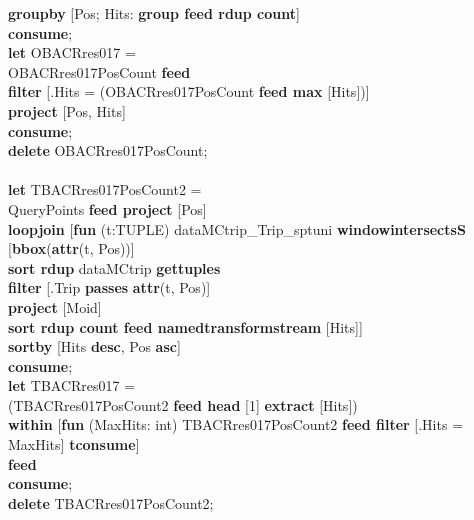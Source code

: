 \documentclass[a4paper]{article}
\newcommand{\op}[1]{\textbf{#1}}
\begin{document}
\begin{scriptsize}
\begin{tabbing}
\>\op{groupby} [Pos; Hits: \op{group feed rdup count}]\\
\op{consume};\\
\op{let} OBACRres017 =\\
\>OBACRres017PosCount \op{feed}\\
\>\op{filter} [.Hits = (OBACRres017PosCount \op{feed max} [Hits])]\\
\>\op{project} [Pos, Hits]\\
\op{consume};\\
\op{delete} OBACRres017PosCount;\\
\\
\op{let} TBACRres017PosCount2 =\\
\>QueryPoints \op{feed project} [Pos]\\
\>\op{loopjoin} [\op{fun} (t:TUPLE) dataMCtrip\_Trip\_sptuni \op{windowintersectsS} [\op{bbox}(\op{attr}(t, Pos))]\\
\>\>\op{sort rdup} dataMCtrip \op{gettuples}\\
\>\>\op{filter} [.Trip \op{passes} \op{attr}(t, Pos)]\\
\>\>\op{project} [Moid]\\
\>\>\op{sort rdup count feed namedtransformstream} [Hits]]\\
\>\op{sortby} [Hits \op{desc}, Pos \op{asc}]\\
\op{consume};\\
\op{let} TBACRres017 =\\
\>(TBACRres017PosCount2 \op{feed head} [1] \op{extract} [Hits])\\
\>\>\op{within} [\op{fun} (MaxHits: int) TBACRres017PosCount2 \op{feed filter} [.Hits = MaxHits] \op{tconsume}]\\
\>\op{feed}\\
\op{consume};\\
\op{delete} TBACRres017PosCount2;\\
\end{tabbing}
\end{scriptsize}
\listoftodos
\end{document}
